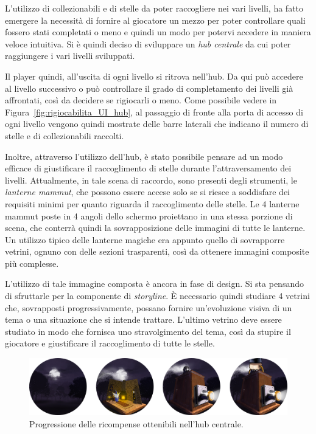 L’utilizzo di collezionabili e di stelle da poter raccogliere nei vari livelli, ha fatto emergere la necessità di fornire al giocatore un mezzo per poter controllare quali fossero stati completati o meno e quindi un modo per potervi accedere in maniera veloce intuitiva.
Si è quindi deciso di sviluppare un \textit{hub centrale} da cui poter raggiungere i vari livelli sviluppati.

Il player quindi, all’uscita di ogni livello si ritrova nell’hub. Da qui può accedere al livello successivo o può controllare il grado di completamento dei livelli già affrontati, così da decidere se rigiocarli o meno.
Come possibile vedere in Figura~\ref{fig:rigiocabilita_UI_hub}, al passaggio di fronte alla porta di accesso di ogni livello vengono quindi mostrate delle barre laterali che indicano il numero di stelle e di collezionabili raccolti.

Inoltre, attraverso l’utilizzo dell’hub, è stato possibile pensare ad un modo efficace di giustificare il raccoglimento di stelle durante l’attraversamento dei livelli.
Attualmente, in tale scena di raccordo, sono presenti degli strumenti, le \textit{lanterne mammut}, che possono essere accese solo se si riesce a soddisfare dei requisiti minimi per quanto riguarda il raccoglimento delle stelle.
Le 4 lanterne mammut poste in 4 angoli dello schermo proiettano in una stessa porzione di scena, che conterrà quindi la sovrapposizione delle immagini di tutte le lanterne. Un utilizzo tipico delle lanterne magiche era appunto quello di sovrapporre vetrini, ognuno con delle sezioni trasparenti, così da ottenere immagini composite più complesse.

L’utilizzo di tale immagine composta è ancora in fase di design. Si sta pensando di sfruttarle per la componente di \textit{storyline}. È necessario quindi studiare 4 vetrini che, sovrapposti progressivamente, possano fornire un’evoluzione visiva di un tema o una situazione che si intende trattare.
L’ultimo vetrino deve essere studiato in modo che fornisca uno stravolgimento del tema, così da stupire il giocatore e giustificare il raccoglimento di tutte le stelle.

\begin{figure}%
	\centering
	\includegraphics[width= \columnwidth]{images/gameDesign/40_premi.jpg}
	\caption{Progressione delle ricompense ottenibili nell'hub centrale.}
	\label{fig:level_design_ricompense}
\end{figure}

